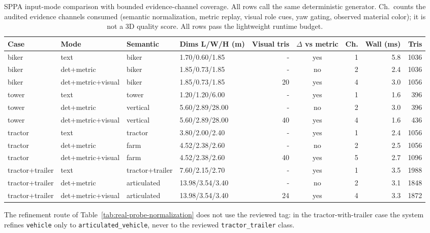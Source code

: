 \documentclass[10pt]{article}
\begin{document}
\begin{table}[H]
\centering
\tiny
\setlength{\tabcolsep}{2pt}
\renewcommand{\arraystretch}{1.06}
\caption{SPPA input-mode comparison with bounded evidence-channel coverage.
All rows call the same deterministic generator. Ch.\ counts the audited
evidence channels consumed (semantic normalization, metric replay, visual
role cues, yaw gating, observed material color); it is not a 3D quality
score. All rows pass the lightweight runtime budget.}
\label{tab:sppa-input-mode-comparison}
\begin{tabular}{@{}llllrcrrr@{}}
\toprule
Case & Mode & Semantic & Dims L/W/H (m) & Visual tris & $\Delta$ vs metric & Ch. & Wall (ms) & Tris \\
\midrule
biker & text & biker & 1.70/0.60/1.85 & - & yes & 1 & 5.8 & 1036 \\
biker & det+metric & biker & 1.85/0.73/1.85 & - & no & 2 & 2.4 & 1036 \\
biker & det+metric+visual & biker & 1.85/0.73/1.85 & 20 & yes & 4 & 3.0 & 1056 \\
tower & text & tower & 1.20/1.20/6.00 & - & yes & 1 & 1.6 & 396 \\
tower & det+metric & vertical & 5.60/2.89/28.00 & - & no & 2 & 3.0 & 396 \\
tower & det+metric+visual & vertical & 5.60/2.89/28.00 & 40 & yes & 4 & 1.6 & 436 \\
tractor & text & tractor & 3.80/2.00/2.40 & - & yes & 1 & 2.4 & 1056 \\
tractor & det+metric & farm & 4.52/2.38/2.60 & - & no & 2 & 2.5 & 1056 \\
tractor & det+metric+visual & farm & 4.52/2.38/2.60 & 40 & yes & 5 & 2.7 & 1096 \\
tractor+trailer & text & tractor+trailer & 7.60/2.15/2.70 & - & yes & 1 & 3.5 & 1988 \\
tractor+trailer & det+metric & articulated & 13.98/3.54/3.40 & - & no & 2 & 3.1 & 1848 \\
tractor+trailer & det+metric+visual & articulated & 13.98/3.54/3.40 & 24 & yes & 4 & 3.3 & 1872 \\
\bottomrule
\end{tabular}
\end{table}

The refinement route of Table~\ref{tab:real-probe-normalization} does not
use the reviewed tag: in the tractor-with-trailer case the system refines
\texttt{vehicle} only to \texttt{articulated\_vehicle}, never to the
reviewed \texttt{tractor\_trailer} class.
\end{document}
